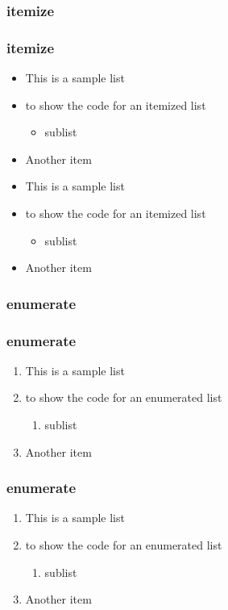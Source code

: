 \subsubsection{itemize}

\begin{frame}[allowframebreaks=0.8,fragile]
\frametitle{itemize}
\begin{teX}
\begin{itemize}
    \item This is a sample list
    \item to show the code for an itemized list
    \begin{itemize}
        \item sublist
    \end{itemize}
    \item Another item
\end{itemize}
\end{teX}
\framebreak
\begin{itemize}
  \item This is a sample list
  \item to show the code for an itemized list
    \begin{itemize}
      \item sublist
    \end{itemize}
  \item Another item
\end{itemize}
\end{frame}

\subsubsection{enumerate}

\begin{frame}[allowframebreaks=0.8,fragile]
\frametitle{enumerate}
\begin{teX}
\begin{enumerate}
    \item This is a sample list
    \item to show the code for an enumerated list
    \begin{enumerate}
        \item sublist
    \end{enumerate}
    \item Another item
\end{enumerate}
\end{teX}
\framebreak
\frametitle{enumerate}
    \begin{enumerate}
        \item This is a sample list
        \item to show the code for an enumerated list
        \begin{enumerate}
            \item sublist
        \end{enumerate}
        \item Another item
   \end{enumerate}
\end{frame}

